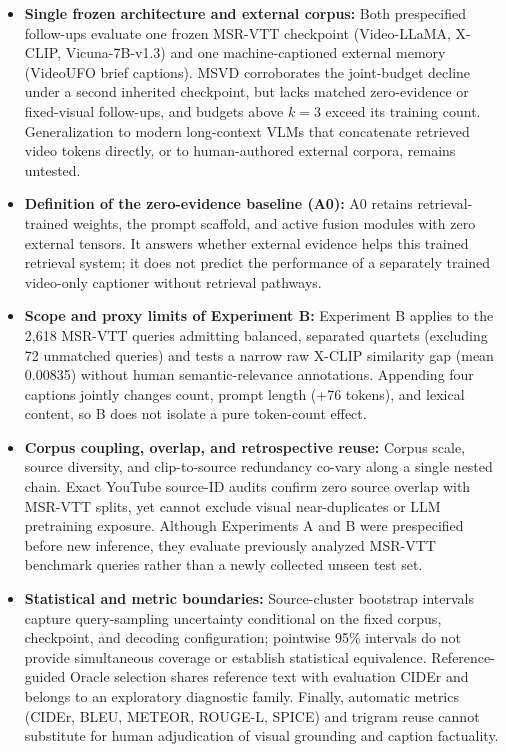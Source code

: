 \documentclass[11pt,a4paper]{article}
\begin{document}
\begin{itemize}
\item \textbf{Single frozen architecture and external corpus:} Both prespecified follow-ups evaluate one frozen MSR-VTT checkpoint (Video-LLaMA, X-CLIP, Vicuna-7B-v1.3) and one machine-captioned external memory (VideoUFO brief captions). MSVD corroborates the joint-budget decline under a second inherited checkpoint, but lacks matched zero-evidence or fixed-visual follow-ups, and budgets above $k=3$ exceed its training count. Generalization to modern long-context VLMs that concatenate retrieved video tokens directly, or to human-authored external corpora, remains untested.
\item \textbf{Definition of the zero-evidence baseline (A0):} A0 retains retrieval-trained weights, the prompt scaffold, and active fusion modules with zero external tensors. It answers whether external evidence helps this trained retrieval system; it does not predict the performance of a separately trained video-only captioner without retrieval pathways.
\item \textbf{Scope and proxy limits of Experiment B:} Experiment B applies to the 2,618 MSR-VTT queries admitting balanced, separated quartets (excluding 72 unmatched queries) and tests a narrow raw X-CLIP similarity gap (mean 0.00835) without human semantic-relevance annotations. Appending four captions jointly changes count, prompt length (+76 tokens), and lexical content, so B does not isolate a pure token-count effect.
\item \textbf{Corpus coupling, overlap, and retrospective reuse:} Corpus scale, source diversity, and clip-to-source redundancy co-vary along a single nested chain. Exact YouTube source-ID audits confirm zero source overlap with MSR-VTT splits, yet cannot exclude visual near-duplicates or LLM pretraining exposure. Although Experiments A and B were prespecified before new inference, they evaluate previously analyzed MSR-VTT benchmark queries rather than a newly collected unseen test set.
\item \textbf{Statistical and metric boundaries:} Source-cluster bootstrap intervals capture query-sampling uncertainty conditional on the fixed corpus, checkpoint, and decoding configuration; pointwise 95\% intervals do not provide simultaneous coverage or establish statistical equivalence. Reference-guided Oracle selection shares reference text with evaluation CIDEr and belongs to an exploratory diagnostic family. Finally, automatic metrics (CIDEr, BLEU, METEOR, ROUGE-L, SPICE) and trigram reuse cannot substitute for human adjudication of visual grounding and caption factuality.
\end{itemize}
\end{document}
